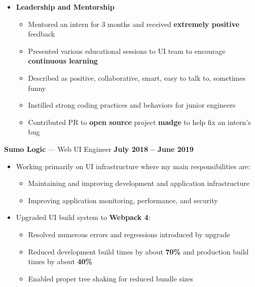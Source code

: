 \documentclass[10pt, oneside]{letter}
\begin{document}
\begin{adjustwidth}{0.1in}{0pt}
\begin{itemize}
\begin{itemize}
              \item \textbf{Leadership and Mentorship}
                \begin{itemize}
                  \item {
                      Mentored an intern for 3 months and received
                      \textbf{extremely positive} feedback
                  }
                  \item {
                      Presented various educational sessions to UI team to
                      encourage \textbf{continuous learning}
                  }
                  \item {
                      Described as positive, collaborative, smart, easy to talk
                      to, sometimes funny
                  }
                  \item {
                      Instilled strong coding practices and behaviors for
                      junior engineers
                  }
                  \item {
                      Contributed PR to \textbf{open source} project
                      \textbf{madge} to help fix an intern's bug
                  }
                \end{itemize}
            \end{itemize}
          \textbf{Sumo Logic} --- Web UI Engineer \hfill \textbf{July 2018 -- June 2019}
            \begin{itemize}
              \item {
                Working primarily on UI infrastructure where my main
                responsibilities are:
              }
                \begin{itemize}
                  \item {
                      Maintaining and improving development and application
                      infrastructure
                  }
                  \item {
                      Improving application monitoring, performance, and
                      security
                  }
                \end{itemize}
              \item Upgraded UI build system to \textbf{Webpack 4}:
                \begin{itemize}
                  \item {
                      Resolved numerous errors and regressions introduced by
                      upgrade
                  }
                  \item {
                      Reduced development build times by about \textbf{70\%}
                      and production build times by about \textbf{40\%}
                  }
                  \item Enabled proper tree shaking for reduced bundle sizes
                \end{itemize}


\end{itemize}
\end{itemize}
\end{adjustwidth}
\end{document}
